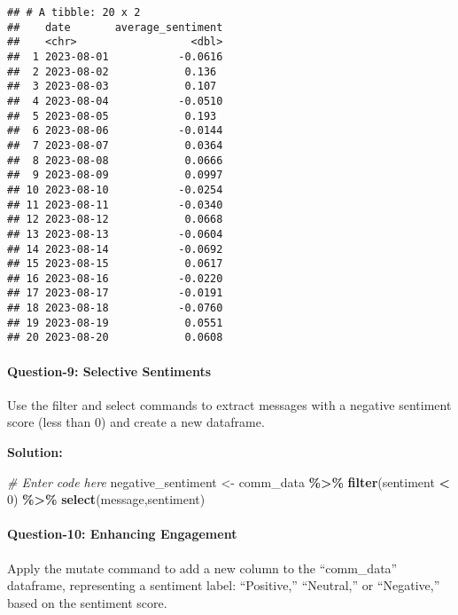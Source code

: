 \documentclass[
]{article}
\newenvironment{Shaded}{\begin{snugshade}}{\end{snugshade}}
\newcommand{\CommentTok}[1]{\textcolor[rgb]{0.56,0.35,0.01}{\textit{#1}}}
\newcommand{\DecValTok}[1]{\textcolor[rgb]{0.00,0.00,0.81}{#1}}
\newcommand{\FunctionTok}[1]{\textcolor[rgb]{0.13,0.29,0.53}{\textbf{#1}}}
\newcommand{\NormalTok}[1]{#1}
\newcommand{\OtherTok}[1]{\textcolor[rgb]{0.56,0.35,0.01}{#1}}
\newcommand{\SpecialCharTok}[1]{\textcolor[rgb]{0.81,0.36,0.00}{\textbf{#1}}}
\begin{document}
\begin{verbatim}
## # A tibble: 20 x 2
##    date       average_sentiment
##    <chr>                  <dbl>
##  1 2023-08-01           -0.0616
##  2 2023-08-02            0.136 
##  3 2023-08-03            0.107 
##  4 2023-08-04           -0.0510
##  5 2023-08-05            0.193 
##  6 2023-08-06           -0.0144
##  7 2023-08-07            0.0364
##  8 2023-08-08            0.0666
##  9 2023-08-09            0.0997
## 10 2023-08-10           -0.0254
## 11 2023-08-11           -0.0340
## 12 2023-08-12            0.0668
## 13 2023-08-13           -0.0604
## 14 2023-08-14           -0.0692
## 15 2023-08-15            0.0617
## 16 2023-08-16           -0.0220
## 17 2023-08-17           -0.0191
## 18 2023-08-18           -0.0760
## 19 2023-08-19            0.0551
## 20 2023-08-20            0.0608
\end{verbatim}

\hypertarget{question-9-selective-sentiments}{%
\paragraph{Question-9: Selective
Sentiments}\label{question-9-selective-sentiments}}

Use the filter and select commands to extract messages with a negative
sentiment score (less than 0) and create a new dataframe.

\textbf{Solution:}

\begin{Shaded}
\begin{Highlighting}[]
\CommentTok{\# Enter code here}
\NormalTok{negative\_sentiment }\OtherTok{\textless{}{-}}\NormalTok{ comm\_data }\SpecialCharTok{\%\textgreater{}\%} 
  \FunctionTok{filter}\NormalTok{(sentiment }\SpecialCharTok{\textless{}} \DecValTok{0}\NormalTok{) }\SpecialCharTok{\%\textgreater{}\%}
  \FunctionTok{select}\NormalTok{(message,sentiment)}
\end{Highlighting}
\end{Shaded}

\hypertarget{question-10-enhancing-engagement}{%
\paragraph{Question-10: Enhancing
Engagement}\label{question-10-enhancing-engagement}}

Apply the mutate command to add a new column to the ``comm\_data''
dataframe, representing a sentiment label: ``Positive,'' ``Neutral,'' or
``Negative,'' based on the sentiment score.
\end{document}
